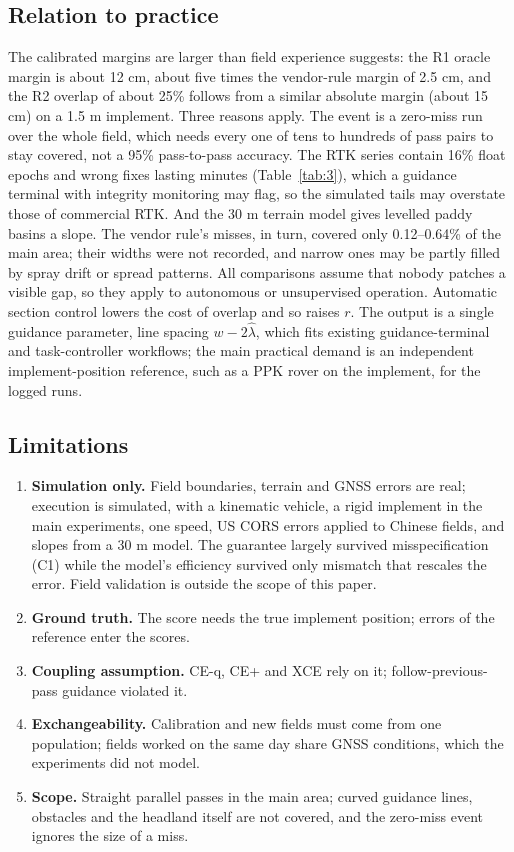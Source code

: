 \documentclass[preprint,12pt,authoryear]{elsarticle}
\providecommand{\tightlist}{\setlength{\itemsep}{0pt}\setlength{\parskip}{0pt}}
\begin{document}
\subsection{Relation to practice}

The calibrated margins are larger than field experience suggests: the R1 oracle margin is about 12 cm, about five times the vendor-rule margin of 2.5 cm, and the R2 overlap of about 25\% follows from a similar absolute margin (about 15 cm) on a 1.5 m implement. Three reasons apply. The event is a zero-miss run over the whole field, which needs every one of tens to hundreds of pass pairs to stay covered, not a 95\% pass-to-pass accuracy. The RTK series contain 16\% float epochs and wrong fixes lasting minutes (Table~\ref{tab:3}), which a guidance terminal with integrity monitoring may flag, so the simulated tails may overstate those of commercial RTK. And the 30 m terrain model gives levelled paddy basins a slope. The vendor rule's misses, in turn, covered only 0.12--0.64\% of the main area; their widths were not recorded, and narrow ones may be partly filled by spray drift or spread patterns. All comparisons assume that nobody patches a visible gap, so they apply to autonomous or unsupervised operation. Automatic section control lowers the cost of overlap and so raises \(r\). The output is a single guidance parameter, line spacing \(w-2\hat\lambda\), which fits existing guidance-terminal and task-controller workflows; the main practical demand is an independent implement-position reference, such as a PPK rover on the implement, for the logged runs.

\subsection{Limitations}

\begin{enumerate}
\def\labelenumi{\arabic{enumi}.}
\tightlist
\item
  \textbf{Simulation only.} Field boundaries, terrain and GNSS errors are real; execution is simulated, with a kinematic vehicle, a rigid implement in the main experiments, one speed, US CORS errors applied to Chinese fields, and slopes from a 30 m model. The guarantee largely survived misspecification (C1) while the model's efficiency survived only mismatch that rescales the error. Field validation is outside the scope of this paper.
\item
  \textbf{Ground truth.} The score needs the true implement position; errors of the reference enter the scores.
\item
  \textbf{Coupling assumption.} CE-q, CE+ and XCE rely on it; follow-previous-pass guidance violated it.
\item
  \textbf{Exchangeability.} Calibration and new fields must come from one population; fields worked on the same day share GNSS conditions, which the experiments did not model.
\item
  \textbf{Scope.} Straight parallel passes in the main area; curved guidance lines, obstacles and the headland itself are not covered, and the zero-miss event ignores the size of a miss.
\end{enumerate}
\end{document}
